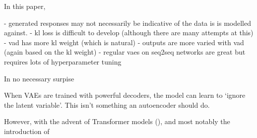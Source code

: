\documentclass[12pt,twoside]{report}
\begin{document}
In this paper, 

- generated responses may not necessarily be indicative of the data is is modelled against.
- kl loss is difficult to develop (although there are many attempts at this)
- vad has more kl weight (which is natural)
- outputs are more varied with vad (again based on the kl weight)
- regular vaes on seq2seq networks are great but requires lots of hyperparameter tuning

In no necessary surpise

When VAEs are trained with powerful decoders, the model can learn to ‘ignore the latent variable’. This isn’t something an autoencoder should do. 

However, with the advent of Transformer models (\cite{chromiak_transformer_2017}), and most notably the introduction of 



 
\end{document}

